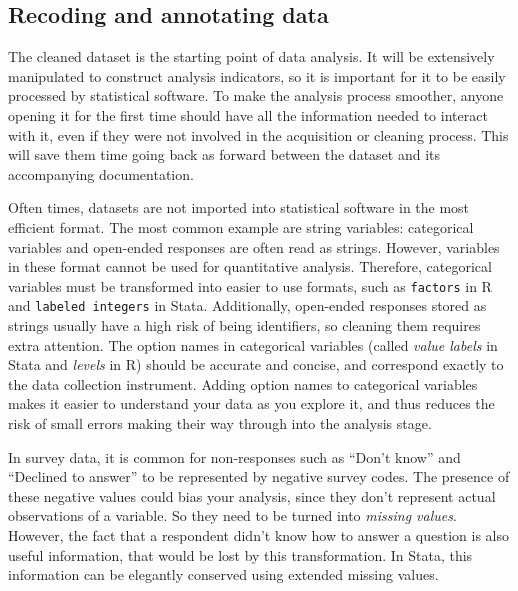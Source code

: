 
\subsection{Recoding and annotating data}

The cleaned dataset is the starting point of data analysis.
It will be extensively manipulated to construct analysis indicators,
so it is important for it to be easily processed by statistical software.
To make the analysis process smoother, 
anyone opening it for the first time should have all the information needed to interact with it,
even if they were not involved in the acquisition or cleaning process.
This will save them time going back as forward between the dataset and its accompanying documentation. 

Often times, datasets are not imported into statistical software in the most efficient format.
The most common example are string variables:
categorical variables and open-ended responses are often read as strings.
However, variables in these format cannot be used for quantitative analysis.
Therefore, categorical variables must be transformed into easier to use formats,
such as \texttt{factors} in R and \texttt{labeled integers} in Stata.
Additionally, open-ended responses stored as strings usually have a high risk of being identifiers, 
so cleaning them requires extra attention.
The option names in categorical variables
(called \textit{value labels} in Stata and \textit{levels} in R)
should be accurate and concise, 
and correspond exactly to the data collection instrument.
Adding option names to categorical variables 
makes it easier to understand your data as you explore it,
and thus reduces the risk of small errors making their way through into the analysis stage.

In survey data, it is common for non-responses such as ``Don't know'' and ``Declined to answer''
to be represented by negative survey codes. 
The presence of these negative values could bias your analysis,
since they don't represent actual observations of a variable.
So they need to be turned into \textit{missing values}.
However, the fact that a respondent didn't know how to answer a question is also useful information,
that would be lost by this transformation.
In Stata, this information can be elegantly conserved using extended missing values.

